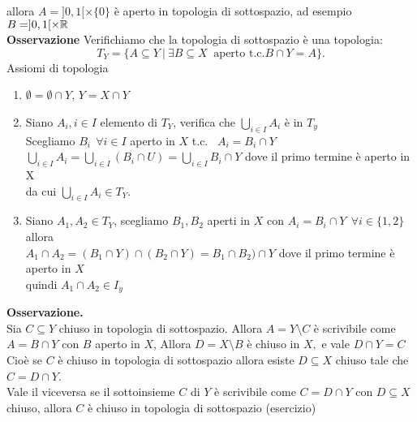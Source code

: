 \documentclass[12px]{article}
\begin{document}
\begin{center}
\end{center}
	   allora  $A = ]0,1[\times\{0\}$ è aperto in topologia di sottospazio, ad esempio  $B = ]0,1[\times\mathbb{R}$\\
	   \textbf{Osservazione} Verifichiamo che la topologia di sottospazio è una topologia:
	   \[
		   T_Y = \{A\subseteq Y \ | \ \exists B\subseteq X \ \text{ aperto t.c.}  B\cap Y = A\}
	   .\] 
	   Assiomi di topologia
	   \begin{enumerate}
		   \item $\emptyset = \emptyset \cap Y$,  $Y = X\cap Y$
		   \item Siano  $A_i, i\in I$ elemento di  $T_Y$, verifica che  $ \bigcup^{}_{i\in I}A_i$ è in $T_y$\\
			   Scegliamo  $B_i \ \ \forall i\in I$ aperto in  $X$ t.c. \ $ A_i = B_i\cap Y$\\
			    $ \bigcup^{}_{i\in I}A_i = \bigcup^{}_{i\in I}(B_i\cap U) = \bigcup^{}_{i\in I}B_i\cap Y$ dove il primo termine è aperto in X\\
			    da cui $  \bigcup^{}_{i\in I}A_i \in T_Y$.\\
		    \item Siano $A_1, A_2\in T_Y$, scegliamo $B_1,B_2$ aperti in $X$ con $A_i = B_i\cap Y \ \ \forall i\in \{1,2\}$ allora \\
			     $A_1\cap A_2 = (B_1\cap Y)\cap (B_2\cap Y) = B_1\cap B_2)\cap Y$ dove il primo termine è aperto in $X$\\
			     quindi $A_1\cap A_2\in I_y$\\
	   \end{enumerate}
			    \textbf{Osservazione.}\\
		 Sia $C\subseteq Y$ chiuso in topologia di sottospazio. Allora $A = Y\setminus C$ è scrivibile come $A = B\cap Y$ con $B$ aperto in $X$, Allora $D = X\setminus B$ è chiuso in $X, $ e vale $D \cap Y = C$\\
		 Cioè se  $C $ è chiuso in topologia di sottospazio allora esiste $D\subseteq X$ chiuso tale che  $C = D\cap Y$.\\
		 Vale il viceversa se il sottoinsieme  $C$ di $Y$ è scrivibile come  $C = D\cap Y$ con $D \subseteq X$ chiuso, allora  $C$ è chiuso in topologia di sottospazio (esercizio)
\end{document}
